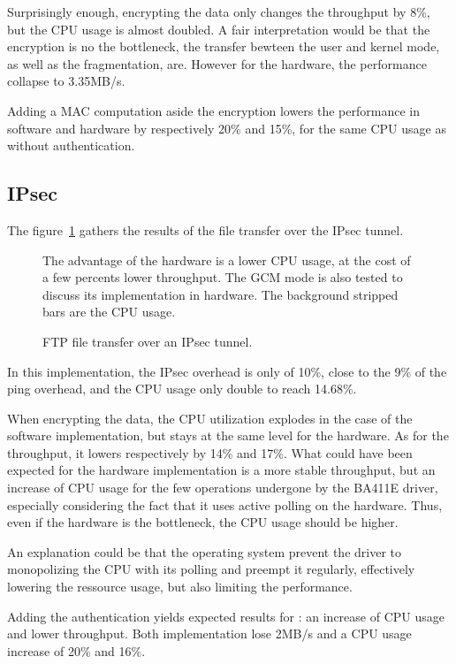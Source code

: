 \noindent Surprisingly enough, encrypting the data only changes the throughput by 8\%, but the CPU usage is almost doubled.
A fair interpretation would be that the encryption is no the bottleneck, the transfer bewteen the user and kernel mode, as well as the fragmentation, are.
However for the hardware, the performance collapse to 3.35MB/s.

Adding a MAC computation aside the encryption lowers the performance in software and hardware by respectively 20\% and 15\%, for the same CPU usage as without authentication.


\subsection{IPsec}
The figure~\ref{fig:ipsec-ftp-bench} gathers the results of the file transfer over the IPsec tunnel.
\begin{figure}[ht]

\caption{FTP file transfer over an IPsec tunnel.}{The advantage of the hardware is a lower CPU usage, at the cost of a few percents lower throughput. The GCM mode is also tested to discuss its implementation in hardware. The background stripped bars are the CPU usage.}
\label{fig:ipsec-ftp-bench}
\end{figure}

In this implementation, the IPsec overhead is only of 10\%, close to the 9\% of the ping overhead, and the CPU usage only double to reach 14.68\%.

When encrypting the data, the CPU utilization explodes in the case of the software implementation, but stays at the same level for the hardware.
As for the throughput, it lowers respectively by 14\% and 17\%.
What could have been expected for the hardware implementation is a more stable throughput, but an increase of CPU usage for the few operations undergone by the BA411E driver, especially considering the fact that it uses active polling on the hardware.
Thus, even if the hardware is the bottleneck, the CPU usage should be higher.

\noindent An explanation could be that the operating system prevent the driver to monopolizing the CPU with its polling and preempt it regularly, effectively lowering the ressource usage, but also limiting the performance.

Adding the authentication yields expected results for : an increase of CPU usage and lower throughput.
Both implementation lose 2MB/s and a CPU usage increase of 20\% and 16\%.

